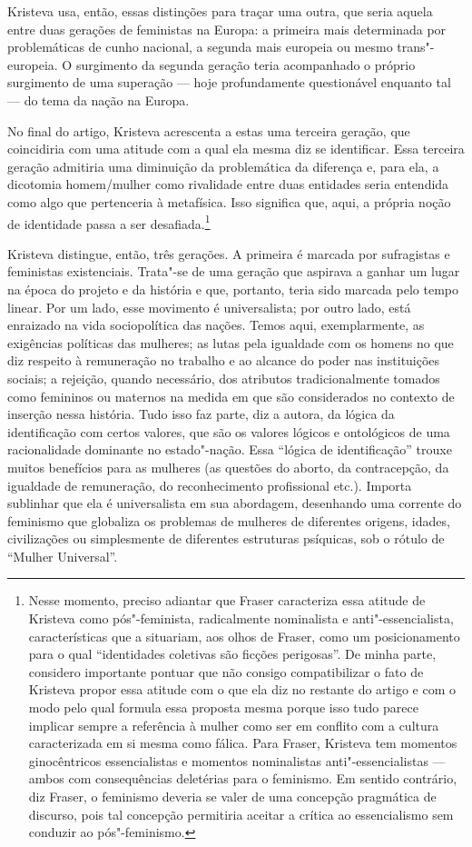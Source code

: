 Kristeva usa, então, essas distinções para traçar uma outra, que seria
aquela entre duas gerações de feministas na Europa: a primeira mais
determinada por problemáticas de cunho nacional, a segunda mais europeia
ou mesmo trans"-europeia. O surgimento da segunda geração teria
acompanhado o próprio surgimento de uma superação --- hoje profundamente
questionável enquanto tal --- do tema da nação na Europa.

No final do artigo, Kristeva acrescenta a estas uma terceira geração,
que coincidiria com uma atitude com a qual ela mesma diz se identificar.
Essa terceira geração admitiria uma diminuição da problemática da
diferença e, para ela, a dicotomia homem/mulher como rivalidade entre
duas entidades seria entendida como algo que pertenceria à metafísica.
Isso significa que, aqui, a própria noção de identidade passa a ser
desafiada.\footnote{Nesse momento, preciso adiantar que Fraser
  caracteriza essa atitude de Kristeva como pós"-feminista, radicalmente
  nominalista e anti"-essencialista, características que a situariam, aos
  olhos de Fraser, como um posicionamento para o qual ``identidades
  coletivas são ficções perigosas''. De minha parte, considero
  importante pontuar que não consigo compatibilizar o fato de Kristeva
  propor essa atitude com o que ela diz no restante do artigo e com o
  modo pelo qual formula essa proposta mesma porque isso tudo parece
  implicar sempre a referência à mulher como ser em conflito com a
  cultura caracterizada em si mesma como fálica. Para Fraser, Kristeva
  tem momentos ginocêntricos essencialistas e momentos nominalistas
  anti"-essencialistas --- ambos com consequências deletérias para o
  feminismo. Em sentido contrário, diz Fraser, o feminismo deveria se
  valer de uma concepção pragmática de discurso, pois tal concepção
  permitiria aceitar a crítica ao essencialismo sem conduzir ao
  pós"-feminismo.}

Kristeva distingue, então, três gerações. A primeira é marcada por
sufragistas e feministas existenciais. Trata"-se de uma geração que
aspirava a ganhar um lugar na época do projeto e da história e que,
portanto, teria sido marcada pelo tempo linear. Por um lado, esse
movimento é universalista; por outro lado, está enraizado na vida
sociopolítica das nações. Temos aqui, exemplarmente, as exigências
políticas das mulheres; as lutas pela igualdade com os homens no que diz
respeito à remuneração no trabalho e ao alcance do poder nas
instituições sociais; a rejeição, quando necessário, dos atributos
tradicionalmente tomados como femininos ou maternos na medida em que são
considerados no contexto de inserção nessa história. Tudo isso faz
parte, diz a autora, da lógica da identificação com certos valores, que
são os valores lógicos e ontológicos de uma racionalidade dominante no
estado"-nação. Essa ``lógica de identificação'' trouxe muitos benefícios
para as mulheres (as questões do aborto, da contracepção, da igualdade
de remuneração, do reconhecimento profissional etc.). Importa sublinhar
que ela é universalista em sua abordagem, desenhando uma corrente do
feminismo que globaliza os problemas de mulheres de diferentes origens,
idades, civilizações ou simplesmente de diferentes estruturas psíquicas,
sob o rótulo de ``Mulher Universal''.

